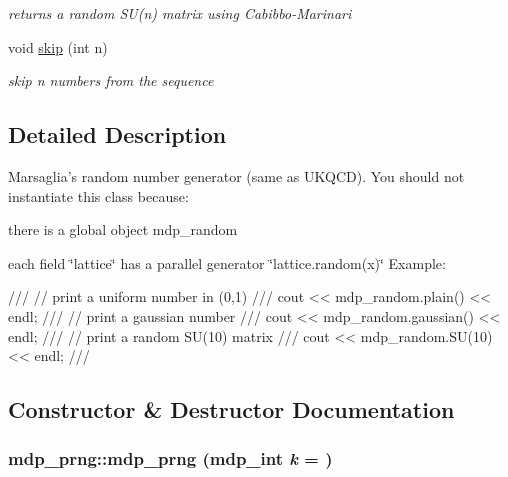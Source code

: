 \begin{DoxyCompactItemize}
\begin{DoxyCompactList}\small\item\em returns a random SU(n) matrix using Cabibbo-\/Marinari \item\end{DoxyCompactList}\item 
void \hyperlink{classmdp__prng_a6214a2e9ed4d3da1e61544501e710999}{skip} (int n)
\begin{DoxyCompactList}\small\item\em skip n numbers from the sequence \item\end{DoxyCompactList}\end{DoxyCompactItemize}


\subsection{Detailed Description}
Marsaglia's random number generator (same as UKQCD). You should not instantiate this class because:
\begin{DoxyItemize}
\item there is a global object mdp\_\-random
\item each field \char`\"{}lattice\char`\"{} has a parallel generator \char`\"{}lattice.random(x)\char`\"{} Example: \begin{DoxyVerb}
///    // print a uniform number in (0,1)
///    cout << mdp_random.plain() << endl;
///    // print a gaussian number
///    cout << mdp_random.gaussian() << endl;
///    // print a random SU(10) matrix
///    cout << mdp_random.SU(10) << endl;
/// \end{DoxyVerb}
 
\end{DoxyItemize}

\subsection{Constructor \& Destructor Documentation}
\hypertarget{classmdp__prng_a57739df3a7629078ca66dbfd7ded1b86}{
\subsubsection[{mdp\_\-prng}]{\setlength{\rightskip}{0pt plus 5cm}mdp\_\-prng::mdp\_\-prng ({\bf mdp\_\-int} {\em k} = {})}}
\label{classmdp__prng_a57739df3a7629078ca66dbfd7ded1b86}


